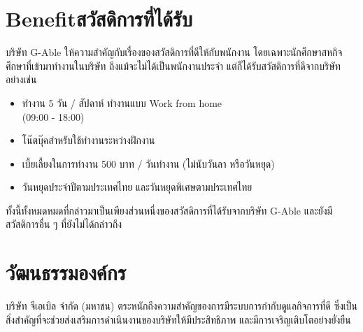 \section{\ifenglish Benefit\else สวัสดิการที่ได้รับ\fi}
บริษัท G-Able ให้ความสำคัญกับเรื่องของสวัสดิการที่ดีให้กับพนักงาน โดยเฉพาะนักศึกษาสหกิจศึกษาที่เข้ามาทำงานในบริษัท
ถึงแม้จะไม่ได้เป็นพนักงานประจำ แต่ก็ได้รับสวัสดิการที่ดีจากบริษัทอย่างเช่น
\begin{itemize}
      \item ทำงาน 5 วัน / สัปดาห์ ทำงานแบบ Work from home \\(09:00 - 18:00)
      \item โน๊ตบุ๊คสำหรับใช้ทำงานระหว่างฝึกงาน
      \item เบี้ยเลี้ยงในการทำงาน 500 บาท / วันทำงาน (ไม่นับวันลา หรือวันหยุด)
      \item วันหยุดประจำปีตามประเทศไทย และวันหยุดพิเศษตามประเทศไทย
\end{itemize}
ทั้งนี้ทั้งหมดหมดที่กล่าวมาเป็นเพียงส่วนหนึ่งของสวัสดิการที่ได้รับจากบริษัท G-Able และยังมีสวัสดิการอื่น ๆ ที่ยังไม่ได้กล่าวถึง

\section{วัฒนธรรมองค์กร}
บริษัท จีเอเบิล จำกัด (มหาชน) ตระหนักถึงความสำคัญของการมีระบบการกำกับดูแลกิจการที่ดี ซึ่งเป็นสิ่งสำคัญที่จะช่วยส่งเสริมการดำเนินงานของบริษัทให้มีประสิทธิภาพ และมีการเจริญเติบโตอย่างยั่งยืน

\clearpage